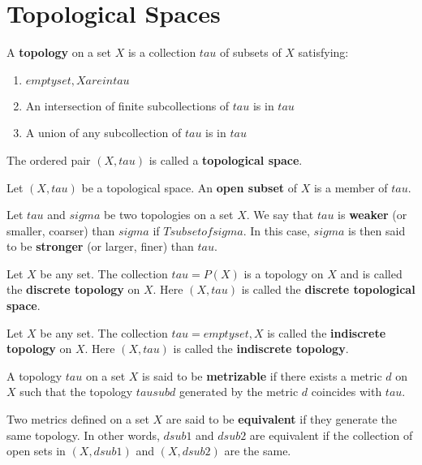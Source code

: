 \section{Topological Spaces}

\begin{defn}
A \textbf{topology} on a set $X$ is a collection $tau$ of subsets of $X$ satisfying:
    \begin{enumerate}
        \item $empty set, X are in tau$
        \item  An intersection of finite subcollections of $tau$ is in $tau$
        \item A union of any subcollection of $tau$ is in $tau$
    \end{enumerate}
The ordered pair $(X, tau)$ is called a \textbf{topological space}.
\end{defn}


\begin{defn}
    Let $(X, tau)$ be a topological space. An \textbf{open subset} of $X$ is a member of $tau$.
\end{defn}

\begin{defn}
Let $tau$ and $sigma$ be two topologies on a set $X$. We say that $tau$ is \textbf{weaker} (or smaller, coarser) than $sigma$ if $T subset of sigma$. In this case, $sigma$ is then said to be \textbf{stronger} (or larger, finer) than $tau$.
\end{defn}

\begin{defn}
Let $X$ be any set. The collection $tau = P(X)$ is a topology on $X$ and is called the \textbf{discrete topology} on $X$. Here $(X, tau)$ is called the \textbf{discrete topological space}.
\end{defn}

\begin{defn}
Let $X$ be any set. The collection $tau = {{ empty set, X }}$ is called the \textbf{indiscrete topology} on $X$. Here $(X, tau)$ is called the \textbf{indiscrete topology}.
\end{defn}

\begin{defn}
A topology $tau$ on a set $X$ is said to be \textbf{metrizable} if there exists a metric $d$ on $X$ such that the topology $tau sub d$ generated by the metric $d$ coincides with $tau$.
\end{defn}

\begin{defn}
Two metrics defined on a set $X$ are said to be \textbf{equivalent} if they generate the same topology. 
In other words, $d sub 1$ and $d sub 2$ are equivalent if the collection of open sets in $(X, d sub 1)$ and $(X, d sub 2)$ are the same.
\end{defn}

